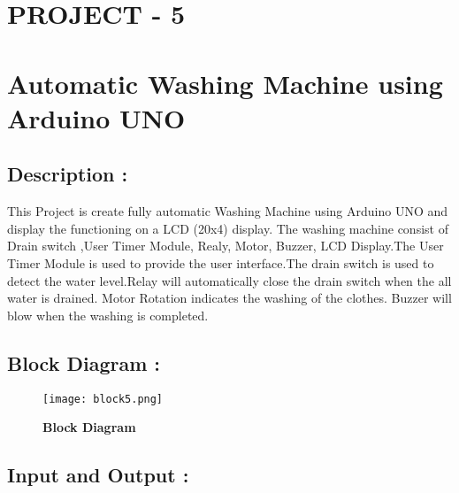 \documentclass[12pt]{article}
\begin{document}
 \pagebreak

\begin{center}
\section*{PROJECT - 5}
\section*{\textbf{Automatic Washing Machine using Arduino UNO}}
\end{center}

\subsection*{\textbf{Description :}}
  This Project is create fully automatic Washing Machine using Arduino UNO and display the functioning on a LCD (20x4) display. The washing machine consist of Drain switch ,User Timer Module, Realy, Motor, Buzzer, LCD Display.The User Timer Module is used to provide the user interface.The drain switch is used to detect the water level.Relay will automatically close the drain switch when the all water is drained. Motor Rotation indicates the washing of the clothes. Buzzer will blow when the washing is completed. 
 \subsection*{\textbf{Block Diagram :}}
 
  \begin{figure}[h]
\centering
\texttt{[image: block5.png]}
\caption{\textbf{Block Diagram}}
\label{block_diagram5}
\end{figure} 
 
 \subsection*{\textbf{Input and Output :}}
 
\end{document}
